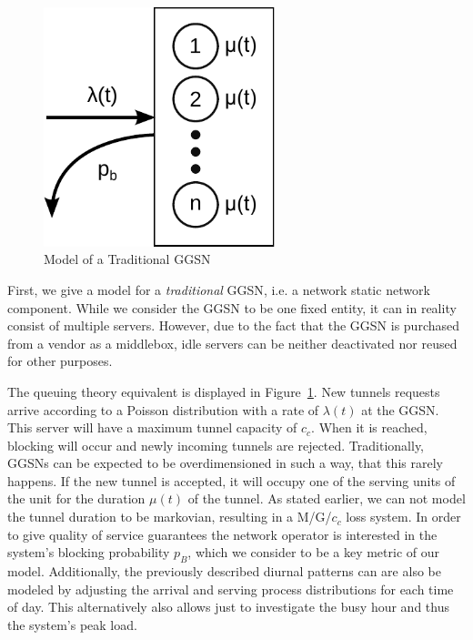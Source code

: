 \begin{figure}[htb]
  \centering
  \includegraphics[width=0.6\textwidth]{images/ggsn-monolithic.pdf}
  \caption{Model of a Traditional GGSN}
  \label{fig:model_traditional_ggsn}
\end{figure}

First, we give a model for a \emph{traditional} \gls{GGSN}, i.e. a network static network component.
While we consider the \gls{GGSN} to be one fixed entity, it can in reality consist of multiple servers. However, due to the fact that the \gls{GGSN} is purchased from a vendor as a middlebox, idle servers can be neither deactivated nor reused for other purposes.

The queuing theory equivalent is displayed in Figure~\ref{fig:model_traditional_ggsn}. New tunnels requests arrive according to a Poisson distribution with a rate of $\lambda(t)$ at the GGSN. This server will have a maximum tunnel capacity of $c_c$. When it is reached, blocking will occur and newly incoming tunnels are rejected. Traditionally, \glspl{GGSN} can be expected to be overdimensioned in such a way, that this rarely happens. If the new tunnel is accepted, it will occupy one of the serving units of the unit for the duration $\mu(t)$ of the tunnel. As stated earlier, we can not model the tunnel duration to be markovian, resulting in a  M/G/$c_c$ loss system. In order to give quality of service guarantees the network operator is interested in the system's blocking probability $p_B$, which we consider to be a key metric of our model. Additionally, the previously described diurnal patterns can are also be modeled by adjusting the arrival and serving process distributions for each time of day. This alternatively also allows just to investigate the busy hour and thus the system's peak load.


